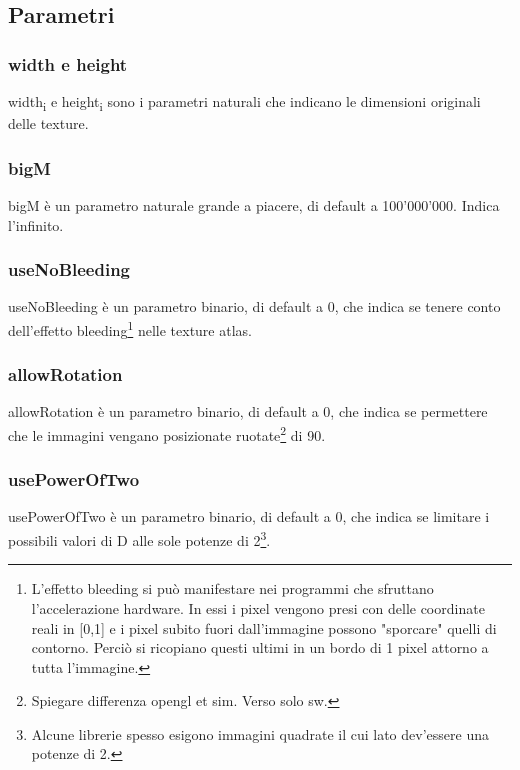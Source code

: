\newcommand{\widthi}{width\textsubscript{i}}
\newcommand{\heighti}{height\textsubscript{i}}


\newcommand{\footBleeding}{L'effetto bleeding si può manifestare nei programmi che sfruttano l'accelerazione hardware. In essi i pixel vengono presi con delle coordinate reali in [0,1] e i pixel subito fuori dall'immagine possono "sporcare" quelli di contorno. Perciò si ricopiano questi ultimi in un bordo di 1 pixel attorno a tutta l'immagine.}
\newcommand{\footRotation}{Spiegare differenza opengl et sim. Verso solo sw.}
\newcommand{\footTwoPowers}{Alcune librerie spesso esigono immagini quadrate il cui lato dev'essere una potenze di 2.}



\subsection{Parametri}

\subsubsection{width e height}

\widthi{} e \heighti{} sono i parametri naturali che indicano le dimensioni originali delle texture.

\subsubsection{bigM}
bigM è un parametro naturale grande a piacere, di default a 100’000’000. Indica l'infinito.

\subsubsection{useNoBleeding}
useNoBleeding è un parametro binario, di default a 0, che indica se tenere conto dell'effetto bleeding\footnote{\footBleeding} nelle texture atlas. 

\subsubsection{allowRotation}
allowRotation è un parametro binario, di default a 0, che indica se permettere che le immagini vengano posizionate ruotate\footnote{\footRotation} di 90\degree.%



\subsubsection{usePowerOfTwo}
usePowerOfTwo è un parametro binario, di default a 0, che indica se limitare i possibili valori di D alle sole potenze di 2\footnote{\footTwoPowers}.

